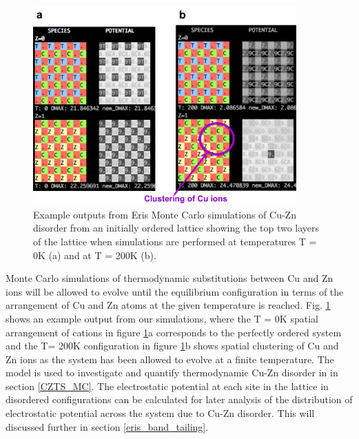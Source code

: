 \documentclass[11pt, twoside]{report}
\begin{document}
\begin{figure}[h!]
  \centering
    \includegraphics[width=0.9\textwidth]{figures/eris_spatial_disorder.png}
    \caption{Example outputs from Eris Monte Carlo simulations of Cu-Zn disorder from an initially ordered lattice showing the top two layers of the lattice when simulations are performed at temperatures T = 0K (a) and at T = 200K (b).}
  \label{eris_spatial_disorder}
\end{figure}

Monte Carlo simulations of thermodynamic substitutions between Cu and Zn ions will be allowed to evolve until the equilibrium configuration in terms of the arrangement of Cu and Zn atoms at the given temperature is reached. Fig. \ref{eris_spatial_disorder} shows an example output from our simulations, where the T = 0K spatial arrangement of cations in figure \ref{eris_spatial_disorder}a corresponds to the perfectly ordered system and the T= 200K configuration in figure \ref{eris_spatial_disorder}b shows spatial clustering of Cu and Zn ions as the system has been allowed to evolve at a finite temperature. The model is used to investigate and quantify thermodynamic Cu-Zn disorder in {\CZTS} in section \ref{CZTS_MC}. The electrostatic potential at each site in the lattice in disordered configurations can be calculated for later analysis of the distribution of electrostatic potential across the system due to Cu-Zn disorder. This will discussed further in section \ref{eris_band_tailing}. 
\end{document}
